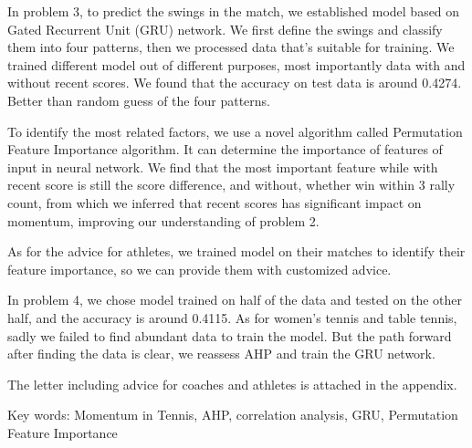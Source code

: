 In problem 3, to predict the swings in the match, we established model based on Gated Recurrent Unit (GRU) network.
We first define the swings and classify them into four patterns, then we processed data that's suitable for training.
We trained different model out of different purposes, most importantly data with and without recent scores.
We found that the accuracy on test data is around 0.4274.
Better than random guess of the four patterns.

To identify the most related factors, we use a novel algorithm called Permutation Feature Importance algorithm.
It can determine the importance of features of input in neural network. We find that the most important feature while
with recent score is still the score difference, and without, whether win within 3 rally count,
from which we inferred that recent scores has significant impact on momentum,
improving our understanding of problem 2.

As for the advice for athletes, we trained model on their matches to identify their feature importance,
so we can provide them with customized advice.

In problem 4, we chose model trained on half of the data and tested on the other half, and the accuracy is around 0.4115.
As for women's tennis and table tennis, sadly we failed to find abundant data to train the model.
But the path forward after finding the data is clear, we reassess AHP and train the GRU network.

The letter including advice for coaches and athletes is attached in the appendix.

Key words: Momentum in Tennis, AHP, correlation analysis, GRU, Permutation Feature Importance